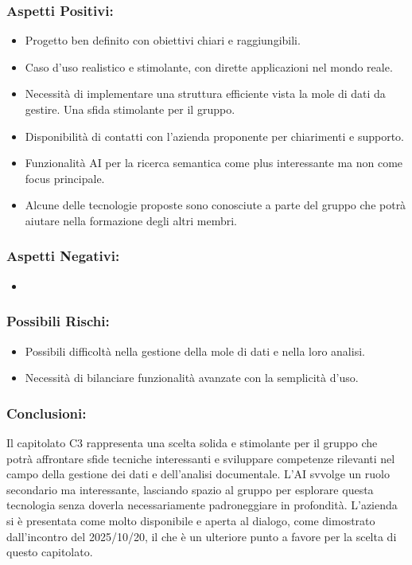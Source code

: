 \documentclass[a4paper,12pt]{article}
\begin{document}
\subsubsection*{Aspetti Positivi:}
\begin{itemize}
    \item Progetto ben definito con obiettivi chiari e raggiungibili.
    \item Caso d'uso realistico e stimolante, con dirette applicazioni nel mondo reale.
    \item Necessità di implementare una struttura efficiente vista la mole di dati da gestire. Una sfida stimolante per il gruppo.
    \item Disponibilità di contatti con l'azienda proponente per chiarimenti e supporto.
    \item Funzionalità AI per la ricerca semantica come plus interessante ma non come focus principale.
    \item Alcune delle tecnologie proposte sono conosciute a parte del gruppo che potrà aiutare nella formazione degli altri membri.
\end{itemize}

\subsubsection*{Aspetti Negativi:}
\begin{itemize}
    \item 
\end{itemize}

\subsubsection*{Possibili Rischi:}
\begin{itemize}
    \item Possibili difficoltà nella gestione della mole di dati e nella loro analisi.
    \item Necessità di bilanciare funzionalità avanzate con la semplicità d'uso.
\end{itemize}

\subsubsection*{Conclusioni:}
Il capitolato C3 rappresenta una scelta solida e stimolante per il gruppo che potrà affrontare sfide tecniche interessanti e sviluppare competenze rilevanti nel campo della gestione dei dati e dell'analisi documentale. 
L'AI svvolge un ruolo secondario ma interessante, lasciando spazio al gruppo per esplorare questa tecnologia senza doverla necessariamente padroneggiare in profondità.
L'azienda si è presentata come molto disponibile e aperta al dialogo, come dimostrato dall'incontro del 2025/10/20, il che è un ulteriore punto a favore per la scelta di questo capitolato.
\end{document}
